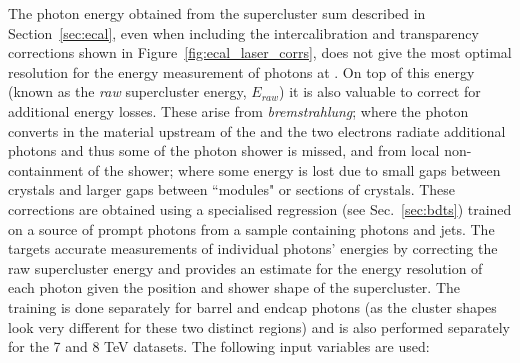 The photon energy obtained from the supercluster sum described in Section~\ref{sec:ecal}, even when including the intercalibration and transparency corrections shown in Figure~\ref{fig:ecal_laser_corrs}, does not give the most optimal resolution for the energy measurement of photons at \CMS. On top of this energy (known as the \emph{raw} supercluster energy, $E_{raw}$) it is also valuable to correct for additional energy losses. These arise from \emph{bremstrahlung}; where the photon converts in the material upstream of the \ECAL and the two electrons radiate additional photons and thus some of the photon shower is missed, and from local non-containment of the shower; where some energy is lost due to small gaps between \ECAL crystals and larger gaps between ``modules" or sections of crystals. These corrections are obtained using a specialised regression \BDT (see Sec.~\ref{sec:bdts}) trained on a \MC source of prompt photons from a sample containing photons and jets. The \BDT targets accurate measurements of individual photons' energies by correcting the raw supercluster energy and provides an estimate for the energy resolution of each photon given the position and shower shape of the supercluster. The training is done separately for barrel and endcap photons (as the cluster shapes look very different for these two distinct regions) and is also performed separately for the 7 and 8 TeV datasets. The following input variables are used:
